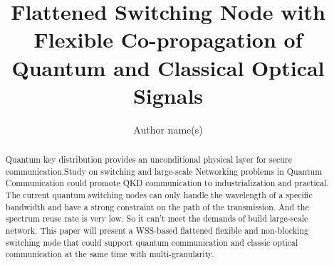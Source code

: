 \documentclass[letterpaper,10pt]{article}
\begin{document}
\title{Flattened Switching Node with Flexible Co-propagation of Quantum and Classical Optical Signals}
\author{Author name(s)}
\address{State Key Laboratory of Information Photonics and Optical Communications, School of Information and Telecommunication Engineering, BUPT Beijing, China, 100876}

\begin{abstract}
\noindent Quantum key distribution provides an unconditional physical layer for secure communication.Study on switching and large-scale Networking problems in Quantum Communication could promote QKD communication to industrialization and practical. The current quantum switching nodes can only handle the wavelength of a specific bandwidth and have a strong constraint on the path of the transmission. And the spectrum reuse rate is very low. So it can't meet the demands of build large-scale network. This paper will present a WSS-based flattened flexible and non-blocking switching node that could support quantum communication and classic optical communication at the same time with multi-granularity.
\end{abstract}
\end{document}
